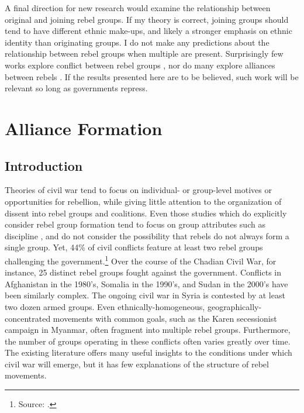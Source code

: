 \documentclass[12pt,]{book}
\let\rmarkdownfootnote\footnote%
\def\footnote{\protect\rmarkdownfootnote}
\begin{document}
A final direction for new research would examine the relationship
between original and joining rebel groups. If my theory is correct,
joining groups should tend to have different ethnic make-ups, and likely
a stronger emphasis on ethnic identity than originating groups. I do not
make any predictions about the relationship between rebel groups when
multiple are present. Surprisingly few works explore conflict between
rebel groups \citep[but see][]{Fjelde2012}, nor do many explore
alliances between rebels \citep[but see][]{Bapat2012}. If the results
presented here are to be believed, such work will be relevant so long as
governments repress.

\chapter{Alliance Formation}\label{alliance-formation-1}

\section{Introduction}\label{introduction-2}

Theories of civil war tend to focus on individual- or group-level
motives \citep[e.g.][]{gurr70, Collier2004} or opportunities
\citep[e.g.][]{fearonlaitin03} for rebellion, while giving little
attention to the organization of dissent into rebel groups and
coalitions. Even those studies which do explicitly consider rebel group
formation tend to focus on group attributes such as discipline
\citep[e.g.][]{Weinstein2007}, and do not consider the possibility that
rebels do not always form a single group. Yet, 44\% of civil conflicts
feature at least two rebel groups challenging the government.\footnote{Source:
  \citet{Pettersson2015a}.} Over the course of the Chadian Civil War,
for instance, 25 distinct rebel groups fought against the government.
Conflicts in Afghanistan in the 1980's, Somalia in the 1990's, and Sudan
in the 2000's have been similarly complex. The ongoing civil war in
Syria is contested by at least two dozen armed groups. Even
ethnically-homogeneous, geographically-concentrated movements with
common goals, such as the Karen secessionist campaign in Myanmar, often
fragment into multiple rebel groups. Furthermore, the number of groups
operating in these conflicts often varies greatly over time. The
existing literature offers many useful insights to the conditions under
which civil war will emerge, but it has few explanations of the
structure of rebel movements.
\end{document}
